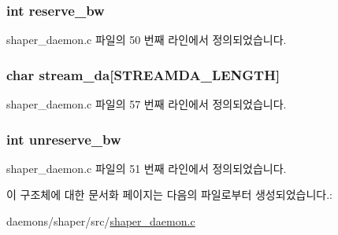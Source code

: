 \subsubsection[{\texorpdfstring{reserve\+\_\+bw}{reserve_bw}}]{\setlength{\rightskip}{0pt plus 5cm}int reserve\+\_\+bw}\hypertarget{structcmd__ip_a097e8a948d42cb86e10e0c667e2226bf}{}\label{structcmd__ip_a097e8a948d42cb86e10e0c667e2226bf}


shaper\+\_\+daemon.\+c 파일의 50 번째 라인에서 정의되었습니다.

\subsubsection[{\texorpdfstring{stream\+\_\+da}{stream_da}}]{\setlength{\rightskip}{0pt plus 5cm}char {\bf stream\+\_\+da}\mbox{[}{\bf S\+T\+R\+E\+A\+M\+D\+A\+\_\+\+L\+E\+N\+G\+TH}\mbox{]}}\hypertarget{structcmd__ip_a2a697cef6f075b15af7e7976a9bdd095}{}\label{structcmd__ip_a2a697cef6f075b15af7e7976a9bdd095}


shaper\+\_\+daemon.\+c 파일의 57 번째 라인에서 정의되었습니다.

\subsubsection[{\texorpdfstring{unreserve\+\_\+bw}{unreserve_bw}}]{\setlength{\rightskip}{0pt plus 5cm}int unreserve\+\_\+bw}\hypertarget{structcmd__ip_a7f0818a9cd62d9342ed94c8165764abe}{}\label{structcmd__ip_a7f0818a9cd62d9342ed94c8165764abe}


shaper\+\_\+daemon.\+c 파일의 51 번째 라인에서 정의되었습니다.



이 구조체에 대한 문서화 페이지는 다음의 파일로부터 생성되었습니다.\+:\begin{DoxyCompactItemize}
\item 
daemons/shaper/src/\hyperlink{shaper__daemon_8c}{shaper\+\_\+daemon.\+c}\end{DoxyCompactItemize}
